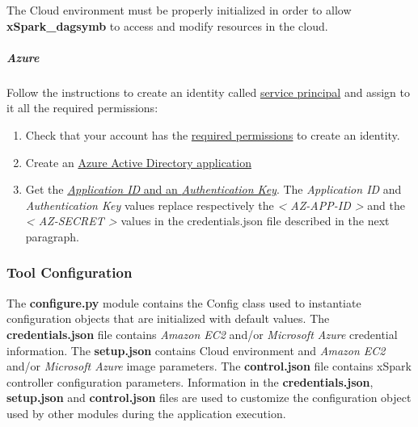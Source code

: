 \documentclass[
]{article}
\let\oldsubparagraph\subparagraph
\renewcommand{\subparagraph}[1]{\oldsubparagraph{#1}\mbox{}}
\begin{document}
The Cloud environment must be properly initialized in order to allow
\textbf{xSpark\_dagsymb} to access and modify resources in the cloud.

\hypertarget{azure}{%
\subparagraph{Azure}\label{azure}}

Follow the instructions to create an identity called
\href{https://docs.microsoft.com/en-us/azure/azure-resource-manager/resource-group-create-service-principal-portal}{service
principal} and assign to it all the required permissions:

\begin{enumerate}
\def\labelenumi{\arabic{enumi})}
\item
  Check that your account has the
  \href{https://docs.microsoft.com/en-us/azure/azure-resource-manager/resource-group-create-service-principal-portal?view=azure-cli-latest\#required-permissions}{required
  permissions} to create an identity.
\item
  Create an
  \href{https://docs.microsoft.com/en-us/azure/azure-resource-manager/resource-group-create-service-principal-portal?view=azure-cli-latest\#create-an-azure-active-directory-application}{Azure
  Active Directory application}
\item
  Get the
  \href{https://docs.microsoft.com/en-us/azure/azure-resource-manager/resource-group-create-service-principal-portal?view=azure-cli-latest\#get-application-id-and-authentication-key}{\emph{Application
  ID} and an \emph{Authentication Key}}. The \emph{Application ID} and
  \emph{Authentication Key} values replace respectively the
  \emph{\textless{} AZ-APP-ID \textgreater{}} and the \emph{\textless{}
  AZ-SECRET \textgreater{}} values in the credentials.json file
  described in the next paragraph.
\end{enumerate}

\hypertarget{tool-configuration}{%
\subsubsection{Tool Configuration}\label{tool-configuration}}

The \textbf{configure.py} module contains the Config class used to
instantiate configuration objects that are initialized with default
values. The \textbf{credentials.json} file contains \emph{Amazon EC2}
and/or \emph{Microsoft Azure} credential information. The
\textbf{setup.json} contains Cloud environment and \emph{Amazon EC2}
and/or \emph{Microsoft Azure} image parameters. The
\textbf{control.json} file contains xSpark controller configuration
parameters. Information in the \textbf{credentials.json},
\textbf{setup.json} and \textbf{control.json} files are used to
customize the configuration object used by other modules during the
application execution.
\end{document}
